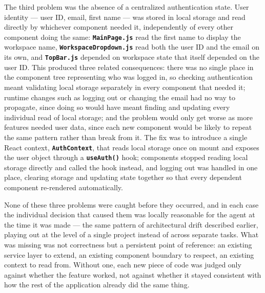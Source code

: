 The third problem was the absence of a centralized authentication state. User identity --- user ID, email, first name --- was stored in local storage and read directly by whichever component needed it, independently of every other component doing the same: \textbf{\texttt{MainPage.js}} read the first name to display the workspace name, \textbf{\texttt{WorkspaceDropdown.js}} read both the user ID and the email on its own, and \textbf{\texttt{TopBar.js}} depended on workspace state that itself depended on the user ID. This produced three related consequences: there was no single place in the component tree representing who was logged in, so checking authentication meant validating local storage separately in every component that needed it; runtime changes such as logging out or changing the email had no way to propagate, since doing so would have meant finding and updating every individual read of local storage; and the problem would only get worse as more features needed user data, since each new component would be likely to repeat the same pattern rather than break from it. The fix was to introduce a single React context, \textbf{\texttt{AuthContext}}, that reads local storage once on mount and exposes the user object through a \textbf{\texttt{useAuth()}} hook; components stopped reading local storage directly and called the hook instead, and logging out was handled in one place, clearing storage and updating state together so that every dependent component re-rendered automatically.

None of these three problems were caught before they occurred, and in each case the individual decision that caused them was locally reasonable for the agent at the time it was made --- the same pattern of architectural drift described earlier, playing out at the level of a single project instead of across separate tasks. What was missing was not correctness but a persistent point of reference: an existing service layer to extend, an existing component boundary to respect, an existing context to read from. Without one, each new piece of code was judged only against whether the feature worked, not against whether it stayed consistent with how the rest of the application already did the same thing.

